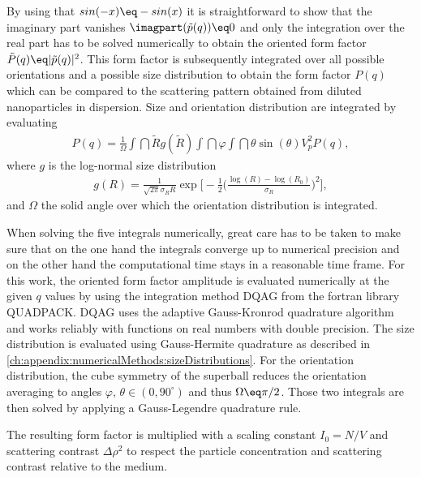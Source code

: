 \documentclass[\main/dresen_thesis.tex]{subfiles}
\begin{document}
By using that $sin(-x) \eq - sin(x)$ it is straightforward to show that the imaginary part vanishes $\imagpart (\tilde{p}(q)) \eq 0$ and only the integration over the real part has to be solved numerically to obtain the oriented form factor $\tilde{P}(q) \eq |\tilde{p}(q)|^2$. This form factor is subsequently integrated over all possible orientations and a possible size distribution to obtain the form factor $P(q)$ which can be compared to the scattering pattern obtained from diluted nanoparticles in dispersion.
Size and orientation distribution are integrated by evaluating
\begin{align}
P(q) = \frac{1}{\Omega}
\int \dint \tilde{R} g(\tilde{R})  \int \dint \varphi \int \dint \theta \sin (\theta) V_p^2 P(q),
\label{eq:superball_intensity_equation}
\end{align}
where $g$ is the log-normal size distribution
\begin{align}
g(R) = \frac{1}{\sqrt{2 \pi} \sigma_R R} \exp \Bigg[ - \frac{1}{2} \bigg(\frac{\log(R) - \log(R_0)}{\sigma_R} \bigg)^2 \Bigg],
\end{align}
and $\Omega$ the solid angle over which the orientation distribution is integrated.

When solving the five integrals numerically, great care has to be taken to make sure that on the one hand the integrals converge up to numerical precision and on the other hand the computational time stays in a reasonable time frame.
For this work, the oriented form factor amplitude is evaluated numerically at the given $q$ values by using the integration method DQAG from the fortran library QUADPACK.
DQAG uses the adaptive Gauss-Kronrod quadrature algorithm and works reliably with functions on real numbers with double precision.
The size distribution is evaluated using Gauss-Hermite quadrature as described in \ref{ch:appendix:numericalMethods:sizeDistributions}.
For the orientation distribution, the cube symmetry of the superball reduces the orientation averaging to angles $\varphi,\, \theta \in (0, 90 ^\circ)$ and thus $\Omega \eq \pi / 2$. Those two integrals are then solved by applying a Gauss-Legendre quadrature rule.

The resulting form factor is multiplied with a scaling constant $I_0=N/V$ and scattering contrast $\Delta \rho^2$ to respect the particle concentration and scattering contrast relative to the medium.
\end{document}
